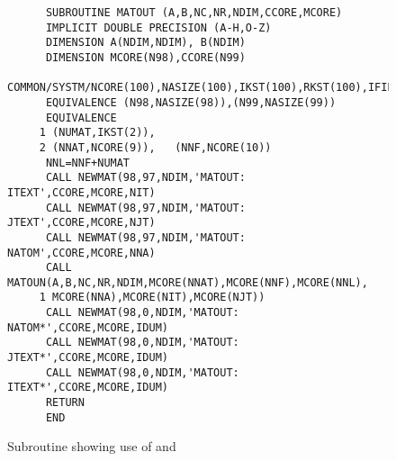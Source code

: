 \begin{figure}
\begin{makeimage}
\end{makeimage}
\compresstable
\begin{verbatim}
      SUBROUTINE MATOUT (A,B,NC,NR,NDIM,CCORE,MCORE)
      IMPLICIT DOUBLE PRECISION (A-H,O-Z)
      DIMENSION A(NDIM,NDIM), B(NDIM)
      DIMENSION MCORE(N98),CCORE(N99)
      COMMON/SYSTM/NCORE(100),NASIZE(100),IKST(100),RKST(100),IFILES(30)
      EQUIVALENCE (N98,NASIZE(98)),(N99,NASIZE(99))
      EQUIVALENCE
     1 (NUMAT,IKST(2)),
     2 (NNAT,NCORE(9)),   (NNF,NCORE(10))
      NNL=NNF+NUMAT
      CALL NEWMAT(98,97,NDIM,'MATOUT: ITEXT',CCORE,MCORE,NIT)
      CALL NEWMAT(98,97,NDIM,'MATOUT: JTEXT',CCORE,MCORE,NJT)
      CALL NEWMAT(98,97,NDIM,'MATOUT: NATOM',CCORE,MCORE,NNA)
      CALL MATOUN(A,B,NC,NR,NDIM,MCORE(NNAT),MCORE(NNF),MCORE(NNL),
     1 MCORE(NNA),MCORE(NIT),MCORE(NJT))
      CALL NEWMAT(98,0,NDIM,'MATOUT: NATOM*',CCORE,MCORE,IDUM)
      CALL NEWMAT(98,0,NDIM,'MATOUT: JTEXT*',CCORE,MCORE,IDUM)
      CALL NEWMAT(98,0,NDIM,'MATOUT: ITEXT*',CCORE,MCORE,IDUM)
      RETURN
      END
\end{verbatim}
\caption{\label{matout} Subroutine  showing use of 
and }
\end{figure}
